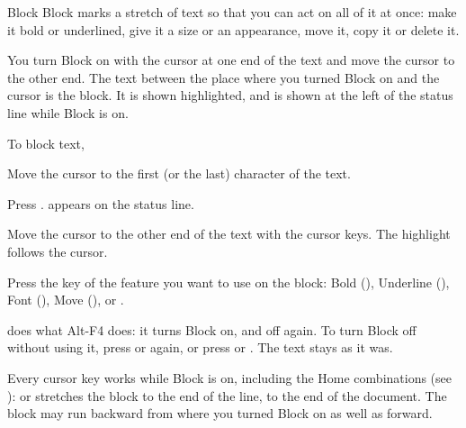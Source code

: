 \begin{Feature}{Block}
Block marks a stretch of text so that you can act on all of it at once:
make it bold or underlined, give it a size or an appearance, move it, copy
it or delete it.

You turn Block on with the cursor at one end of the text and move the
cursor to the other end.  The text between the place where you turned Block
on and the cursor is the block.  It is shown highlighted, and 
is shown at the left of the status line while Block is on.

To block text,
\begin{WPSteps}
\item Move the cursor to the first (or the last) character of the text.
\item Press .   appears on the status line.
\item Move the cursor to the other end of the text with the cursor keys.
The highlight follows the cursor.
\item Press the key of the feature you want to use on the block: Bold
(), Underline (), Font (), Move (), or
.
\end{WPSteps}

 does what Alt-F4 does: it turns Block on, and off again.  To turn
Block off without using it, press  or  again, or
press  or .  The text stays as it was.

\Notes
{}
Every cursor key works while Block is on, including the Home combinations
(see ):  or  stretches the
block to the end of the line,  to the end of the
document.  The block may run backward from where you turned Block on as
well as forward.


\end{Feature}
